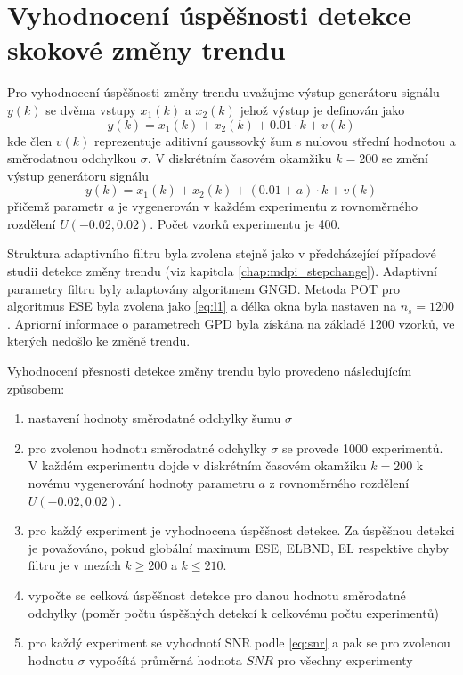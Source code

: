 \section{Vyhodnocení úspěšnosti detekce skokové změny trendu}\label{chap:mdpi_trendchange_evaluation}
Pro vyhodnocení úspěšnosti změny trendu uvažujme výstup generátoru signálu $y(k)$ se dvěma vstupy $x_1(k)$ a $x_2(k)$ jehož výstup je definován jako
\begin{equation}\label{eq:trnd_stats}
    y(k) = x_1(k) + x_2(k) + 0.01 \cdot k + v(k)
\end{equation}
kde člen $v(k)$ reprezentuje aditivní gaussovký šum s nulovou střední hodnotou a směrodatnou odchylkou $\sigma$. V diskrétním časovém okamžiku $k=200$ se změní výstup generátoru signálu
\begin{equation}
    y(k) = x_1(k) + x_2(k) + (0.01 + a) \cdot k + v(k)
\end{equation}
přičemž parametr $a$ je vygenerován v každém experimentu z rovnoměrného rozdělení $U(-0.02,0.02)$. Počet vzorků experimentu je 400.
\par 
Struktura adaptivního filtru byla zvolena stejně jako v předcházející případové studii detekce změny trendu (viz kapitola \ref{chap:mdpi_stepchange}). Adaptivní parametry filtru byly adaptovány algoritmem GNGD. Metoda POT pro algoritmus ESE byla zvolena jako \ref{eq:l1} a délka okna byla nastaven na $n_s=1200$. Apriorní informace o parametrech GPD byla získána na základě 1200 vzorků, ve kterých nedošlo ke změně trendu. 
\par 
Vyhodnocení přesnosti detekce změny trendu bylo provedeno následujícím způsobem:
\begin{enumerate}
\item nastavení hodnoty směrodatné odchylky šumu $\sigma$
\item pro zvolenou hodnotu směrodatné odchylky $\sigma$ se provede 1000 experimentů. V každém experimentu dojde v diskrétním časovém okamžiku $k=200$ k  novému vygenerování hodnoty parametru $a$ z rovnoměrného rozdělení $U(-0.02,0.02)$.
\item pro každý experiment je vyhodnocena úspěšnost detekce. Za úspěšnou detekci je považováno, pokud globální maximum ESE, ELBND, EL respektive chyby filtru je v mezích $k\geq 200$ a $k\leq 210$. 
\item vypočte se celková úspěšnost detekce pro danou hodnotu směrodatné odchylky (poměr počtu úspěšných detekcí k celkovému počtu experimentů)
\item pro každý experiment se vyhodnotí SNR podle \ref{eq:snr} a pak se pro zvolenou hodnotu $\sigma$ vypočítá průměrná hodnota $SNR$ pro všechny experimenty
\end{enumerate}

